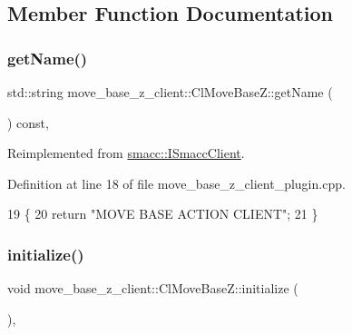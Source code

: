 \subsection{Member Function Documentation}
\mbox{\label{classmove__base__z__client_1_1ClMoveBaseZ_aa7446f57e3740d89c71ba12f1f3c00c0}} 
\subsubsection{\texorpdfstring{get\+Name()}{getName()}}
{\footnotesize\ttfamily std\+::string move\+\_\+base\+\_\+z\+\_\+client\+::\+Cl\+Move\+Base\+Z\+::get\+Name (\begin{DoxyParamCaption}{ }\end{DoxyParamCaption}) const\hspace{0.3cm}{\ttfamily [override]}, {\ttfamily [virtual]}}



Reimplemented from \hyperlink{classsmacc_1_1ISmaccClient_a8c3ce19f182e71909c5dc6263d25be69}{smacc\+::\+I\+Smacc\+Client}.



Definition at line 18 of file move\+\_\+base\+\_\+z\+\_\+client\+\_\+plugin.\+cpp.


\begin{DoxyCode}
19 \{
20     \textcolor{keywordflow}{return} \textcolor{stringliteral}{"MOVE BASE ACTION CLIENT"};
21 \}
\end{DoxyCode}
\mbox{\label{classmove__base__z__client_1_1ClMoveBaseZ_a082cef8bf5dbd0ec06adfe2a7aefbf70}} 
\subsubsection{\texorpdfstring{initialize()}{initialize()}}
{\footnotesize\ttfamily void move\+\_\+base\+\_\+z\+\_\+client\+::\+Cl\+Move\+Base\+Z\+::initialize (\begin{DoxyParamCaption}{ }\end{DoxyParamCaption})\hspace{0.3cm}{\ttfamily [override]}, {\ttfamily [virtual]}}



